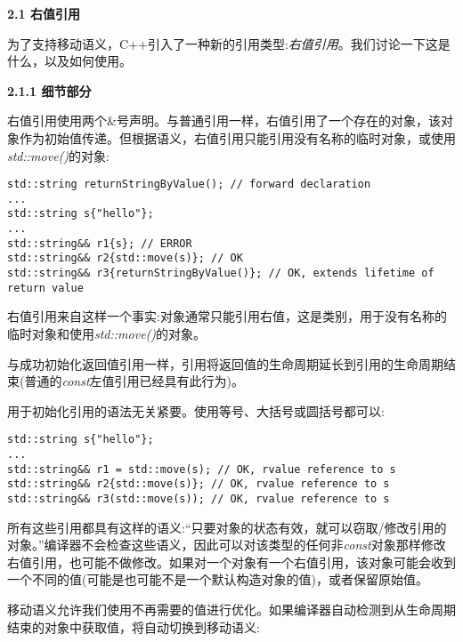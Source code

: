 \hspace*{\fill} \par %
\textbf{2.1 右值引用}

为了支持移动语义，C++引入了一种新的引用类型:\textit{右值引用}。我们讨论一下这是什么，以及如何使用。\par

\hspace*{\fill} \par %
\textbf{2.1.1 细节部分}

右值引用使用两个\&号声明。与普通引用一样，右值引用了一个存在的对象，该对象作为初始值传递。但根据语义，右值引用只能引用没有名称的临时对象，或使用\textit{std::move()}的对象:\par

\begin{lstlisting}[caption={}]
std::string returnStringByValue(); // forward declaration
...
std::string s{"hello"};
...
std::string&& r1{s}; // ERROR
std::string&& r2{std::move(s)}; // OK
std::string&& r3{returnStringByValue()}; // OK, extends lifetime of return value
\end{lstlisting}

右值引用来自这样一个事实:对象通常只能引用右值，这是类别，用于没有名称的临时对象和使用\textit{std::move()}的对象。\par

与成功初始化返回值引用一样，引用将返回值的生命周期延长到引用的生命周期结束(普通的\textit{const}左值引用已经具有此行为)。\par

用于初始化引用的语法无关紧要。使用等号、大括号或圆括号都可以:\par

\begin{lstlisting}[caption={}]
std::string s{"hello"};
...
std::string&& r1 = std::move(s); // OK, rvalue reference to s
std::string&& r2{std::move(s)}; // OK, rvalue reference to s
std::string&& r3(std::move(s)); // OK, rvalue reference to s
\end{lstlisting}

所有这些引用都具有这样的语义:“只要对象的状态有效，就可以窃取/修改引用的对象。”编译器不会检查这些语义，因此可以对该类型的任何非\textit{const}对象那样修改右值引用，也可能不做修改。如果对一个对象有一个右值引用，该对象可能会收到一个不同的值(可能是也可能不是一个默认构造对象的值)，或者保留原始值。\par

移动语义允许我们使用不再需要的值进行优化。如果编译器自动检测到从生命周期结束的对象中获取值，将自动切换到移动语义:\par

